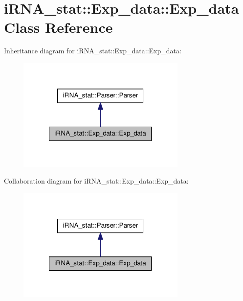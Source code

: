 \hypertarget{classiRNA__stat_1_1Exp__data_1_1Exp__data}{
\section{i\-R\-N\-A\-\_\-stat\-:\-:\-Exp\-\_\-data\-:\-:\-Exp\-\_\-data \-Class \-Reference}
\label{classiRNA__stat_1_1Exp__data_1_1Exp__data}
}


\-Inheritance diagram for i\-R\-N\-A\-\_\-stat\-:\-:\-Exp\-\_\-data\-:\-:\-Exp\-\_\-data\-:
\nopagebreak
\begin{figure}[H]
\begin{center}
\leavevmode
\includegraphics[width=236pt]{classiRNA__stat_1_1Exp__data_1_1Exp__data__inherit__graph}
\end{center}
\end{figure}


\-Collaboration diagram for i\-R\-N\-A\-\_\-stat\-:\-:\-Exp\-\_\-data\-:\-:\-Exp\-\_\-data\-:
\nopagebreak
\begin{figure}[H]
\begin{center}
\leavevmode
\includegraphics[width=236pt]{classiRNA__stat_1_1Exp__data_1_1Exp__data__coll__graph}
\end{center}
\end{figure}
